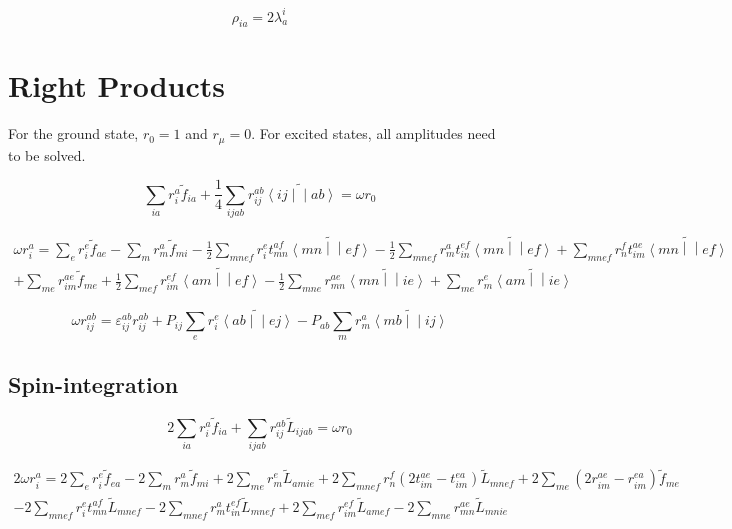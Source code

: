 \documentclass{article}
\newcommand{\tei}[2]{\left<{#1}\middle|\middle|{#2}\right>}
\begin{document}
\begin{equation}
  \rho_{ia} = 2\lambda_a^i
\end{equation}

\section{Right Products}

For the ground state, $r_0 = 1$ and $r_\mu = 0$. For excited states, all amplitudes need to be solved. 

\begin{equation}
  \sum_{ia}r_i^a\tilde{f}_{ia} + \frac{1}{4}\sum_{ijab}r_{ij}^{ab}\tilde{\tei{ij}{ab}} = \omega r_0
\end{equation}

\begin{multline}
  \omega r_i^a = \sum_er_i^e\tilde{f}_{ae} - \sum_mr_m^a\tilde{f}_{mi} - \frac{1}{2}\sum_{mnef}r_i^et_{mn}^{af}\widetilde{\tei{mn}{ef}} - \frac{1}{2}\sum_{mnef}r_m^at_{in}^{ef}\widetilde{\tei{mn}{ef}} + \sum_{mnef}r_n^ft_{im}^{ae}\widetilde{\tei{mn}{ef}}\\
  + \sum_{me}r_{im}^{ae}\tilde{f}_{me} + \frac{1}{2}\sum_{mef}r_{im}^{ef}\widetilde{\tei{am}{ef}} - \frac{1}{2}\sum_{mne}r_{mn}^{ae}\widetilde{\tei{mn}{ie}} + \sum_{me}r_m^e\widetilde{\tei{am}{ie}}
\end{multline}

\begin{equation}
  \omega r_{ij}^{ab} = \varepsilon_{ij}^{ab}r_{ij}^{ab} + P_{ij}\sum_er_i^e\widetilde{\tei{ab}{ej}} - P_{ab}\sum_mr_m^a\widetilde{\tei{mb}{ij}}
\end{equation}

\subsection{Spin-integration}

\begin{equation}
  2\sum_{ia}r_i^a\tilde{f}_{ia} + \sum_{ijab}r_{ij}^{ab}\tilde{L}_{ijab} = \omega r_0
\end{equation}

\begin{multline}
  2\omega r_{i}^{a} = 2\sum_er_i^e\tilde{f}_{ea} - 2\sum_mr_m^a\tilde{f}_{mi} + 2\sum_{me}r_m^e\tilde{L}_{amie} + 2\sum_{mnef}r_n^f\left(2t_{im}^{ae} - t_{im}^{ea}\right)\tilde{L}_{mnef} + 2\sum_{me}\left(2r_{im}^{ae} - r_{im}^{ea}\right)\tilde{f}_{me}\\
  - 2\sum_{mnef}r_i^et_{mn}^{af}\tilde{L}_{mnef} - 2\sum_{mnef}r_m^at_{in}^{ef}\tilde{L}_{mnef} + 2\sum_{mef}r_{im}^{ef}\tilde{L}_{amef} - 2\sum_{mne} r_{mn}^{ae}\tilde{L}_{mnie}
\end{multline}
\end{document}
